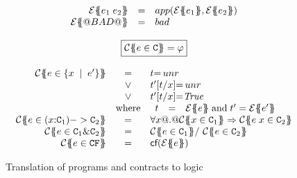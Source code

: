 \begin{figure}
\[\begin{array}{c}
\begin{array}{rcl}
\etrans{\Sigma}{\Gamma}{e_1\;e_2} & = & \formula{app(\etrans{\Sigma}{\Gamma}{e_1},
                                                     \etrans{\Sigma}{\Gamma}{e_2})} \\
\etrans{\Sigma}{\Gamma}{@BAD@} & = & \formula{\bad}
\end{array}
\\ \\
\ruleform{\ctrans{\Sigma}{\Gamma}{e \in \Ct} = \formula{\phi}} \\ \\
\begin{array}{rcl}
\ctrans{\Sigma}{\Gamma}{e \in \{x\;\mid\;e' \}}
  & = & \formula{t{=}\unr} \\
  & \lor & \formula{t'[t/x]{=}\unr} \\
  & \lor & \formula{t'[t/x]{=}\True} \\
  & \mbox{where} &
    \begin{array}[t]{rcl}
      t  & = & \etrans{\Sigma}{\Gamma}{e} \; \text{and} \; t' = \etrans{\Sigma}{\Gamma}{e'}
    \end{array}
\\
\ctrans{\Sigma}{\Gamma}{e \in (x{:}\Ct_1) -> \Ct_2}
  & = & \formula{\forall x @.@ \ctrans{\Sigma}{\Gamma,x}{x \in \Ct_1}
                          \Rightarrow \ctrans{\Sigma}{\Gamma,x}{e\;x \in \Ct_2}}
\\
\ctrans{\Sigma}{\Gamma}{e \in \Ct_1 \& \Ct_2}
   & = & \formula{ \ctrans{\Sigma}{\Gamma}{e \in \Ct_1} /\ \ctrans{\Sigma}{\Gamma}{e \in \Ct_2}}
\\
\ctrans{\Sigma}{\Gamma}{e \in \CF} & = & \formula{\lcf{\etrans{\Sigma}{\Gamma}{e}}}
\end{array}
\end{array}\]
\caption{Translation of programs and contracts to logic}
   \label{fig:etrans}\label{fig:contracts-minless}
\end{figure}
